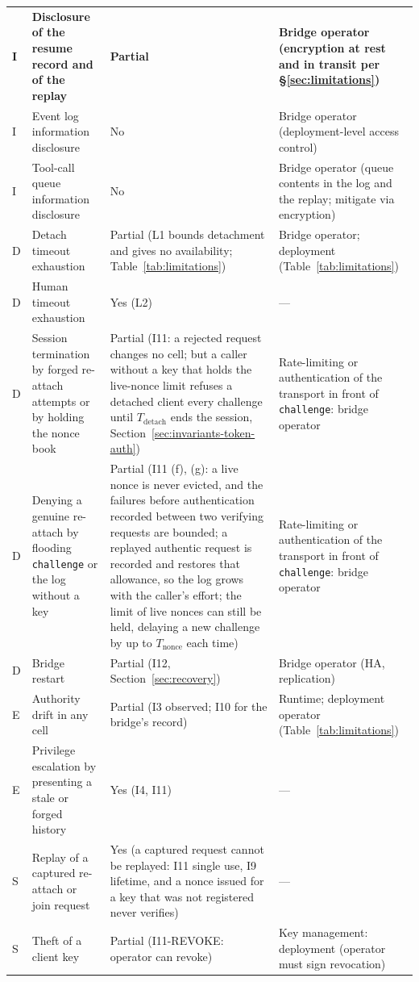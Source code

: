 \begin{table}[htbp]
\begin{tabularx}{\columnwidth}{l >{\raggedright\arraybackslash}X >{\raggedright\arraybackslash}X >{\raggedright\arraybackslash}X}
\textbf{I} & \textbf{Disclosure of the resume record and of the replay} & \textbf{Partial} & \textbf{Bridge operator (encryption at rest and in transit per \S\ref{sec:limitations})} \\
I & Event log information disclosure & No & Bridge operator (deployment-level access control) \\
I & Tool-call queue information disclosure & No & Bridge operator (queue contents in the log and the replay; mitigate via encryption) \\
D & Detach timeout exhaustion & Partial (L1 bounds detachment and gives no availability; Table~\ref{tab:limitations}) & Bridge operator; deployment (Table~\ref{tab:limitations}) \\
D & Human timeout exhaustion & Yes (L2) & --- \\
D & Session termination by forged re-attach attempts or by holding the nonce book & Partial (I11: a rejected request changes no cell; but a caller without a key that holds the live-nonce limit refuses a detached client every challenge until $T_{\text{detach}}$ ends the session, Section~\ref{sec:invariants-token-auth}) & Rate-limiting or authentication of the transport in front of \texttt{challenge}: bridge operator \\
D & Denying a genuine re-attach by flooding \texttt{challenge} or the log without a key & Partial (I11 (f), (g): a live nonce is never evicted, and the failures before authentication recorded between two verifying requests are bounded; a replayed authentic request is recorded and restores that allowance, so the log grows with the caller's effort; the limit of live nonces can still be held, delaying a new challenge by up to $T_{\text{nonce}}$ each time) & Rate-limiting or authentication of the transport in front of \texttt{challenge}: bridge operator \\
D & Bridge restart & Partial (I12, Section~\ref{sec:recovery}) & Bridge operator (HA, replication) \\
E & Authority drift in any cell & Partial (I3 observed; I10 for the bridge's record) & Runtime; deployment operator (Table~\ref{tab:limitations}) \\
E & Privilege escalation by presenting a stale or forged history & Yes (I4, I11) & --- \\
S & Replay of a captured re-attach or join request & Yes (a captured request cannot be replayed: I11 single use, I9 lifetime, and a nonce issued for a key that was not registered never verifies) & --- \\
S & Theft of a client key & Partial (I11-REVOKE: operator can revoke) & Key management: deployment (operator must sign revocation) \\
\bottomrule
\end{tabularx}
\end{table}

